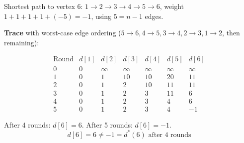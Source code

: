 \documentclass[11pt]{article}
\begin{document}
Shortest path to vertex $6$: $1 \to 2 \to 3 \to 4 \to 5 \to 6$, weight $1{+}1{+}1{+}1{+}({-}5) = -1$, using $5 = n - 1$ edges.

\textbf{Trace} with worst-case edge ordering ($5{\to}6, 4{\to}5, 3{\to}4, 2{\to}3, 1{\to}2$, then remaining):

\[
\begin{array}{c|cccccc}
\text{Round} & d[1] & d[2] & d[3] & d[4] & d[5] & d[6] \\ \hline
0 & 0 & \infty & \infty & \infty & \infty & \infty \\
1 & 0 & 1 & 10 & 10 & 20 & 11 \\
2 & 0 & 1 & 2 & 10 & 11 & 11 \\
3 & 0 & 1 & 2 & 3 & 11 & 6 \\
4 & 0 & 1 & 2 & 3 & 4 & 6 \\
5 & 0 & 1 & 2 & 3 & 4 & -1
\end{array}
\]

After 4 rounds: $d[6] = 6$. After 5 rounds: $d[6] = -1$.
\[\boxed{d[6] = 6 \ne -1 = d^*(6) \text{ after 4 rounds}}\]
\end{document}

